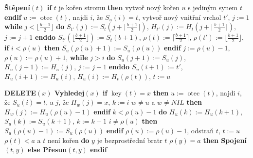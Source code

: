 \documentclass[a4paper,12pt]{article}
\DeclareMathOperator*{\otec}{otec}
\DeclareMathOperator*{\key}{key}
\begin{document}
{\bf Štěpení$(t)$\newline 
if} $t$ je kořen stromu {\bf then}\newline 
\phantom{---}vytvoř nový kořen $u$ s jediným synem $t$\newline 
{\bf endif}\newline 
$u:=\otec(t)$, najdi $i$, že $S_u(i)=t$,\newline 
vytvoř nový vnitřní vrchol $t'$, $j:=1$\newline 
{\bf while} $j<\lfloor\frac {b+1}2\rfloor$ {\bf do}\newline 
\phantom{---}$S_{t'}(j):=S_t(j+\lceil\frac {b+1}2\rceil )$, $H_{t'}(j):=H_t(j+\lceil\frac {b+1}2\rceil)$, $j:=j+1$\newline 
{\bf enddo\newline 
$S_{t'}(\lfloor\frac {b+1}2\rfloor ):=S_t(b+1)$}, $\rho (t):=\lceil\frac {
b+1}2\rceil$, $\rho (t'):=\lfloor\frac {b+1}2\rfloor$,\newline 
{\bf if} $i<\rho (u)$ {\bf then} $S_u(\rho (u)+1):=S_u(\rho (u))$ {\bf endif\newline}
$j:=\rho (u)-1$, $\rho (u):=\rho (u)+1$,\newline 
{\bf while} $j>i$ {\bf do}\newline 
\phantom{---}$S_u(j+1):=S_u(j)$, $H_u(j+1):=H_u(j)$, $j:=j-1$\newline 
{\bf enddo\newline 
$S_u(i+1):=t'$}, $H_u(i+1):=H_u(i)$, $H_u(i):=H_t(\rho (t))$, 
$t:=u$

{\bf DELETE$(x)$\newline 
Vyhledej$(x)$\newline 
if} $\key(t)=x$ {\bf then}\newline 
\phantom{---}$u:=\otec(t)$, najdi $i$, že $S_u(i)=t$, a $j$, že $H_w(j)=x$, $k:=i$\newline 
\phantom{---}{\bf if} $w\ne u$ a $w\ne NIL$ {\bf then} $H_w(j):=H_u(\rho (u)-1)$ {\bf endif}\newline 
\phantom{---}{\bf while} $k<\rho (u)-1$ {\bf do}\newline 
\phantom{------}$H_u(k):=H_u(k+1)$, $S_u(k):=S_u(k+1)$, $k:=k+1$ \newline 
\phantom{---}{\bf enddo}\newline 
\phantom{---}{\bf if} $i\ne\rho(u)$ {\bf then} $S_u(\rho (u)-1):=S_u(\rho (u))$ {\bf endif}\newline
\phantom{---}$\rho (u):=\rho (u)-1$, odstraň $t$, $t:=u$ \newline 
\phantom{---}{\bf while} $\rho (t)<a$ a $t$ není kořen {\bf do}\newline 
\phantom{------}$y$ je bezprostřední bratr $t$\newline 
\phantom{------}{\bf if} $\rho (y)=a$ {\bf then Spojení$(t,y)$ else Přesun$
(t,y)$ endif}\newline 
\phantom{---}{\bf enddo\newline 
endif}
\end{document}
